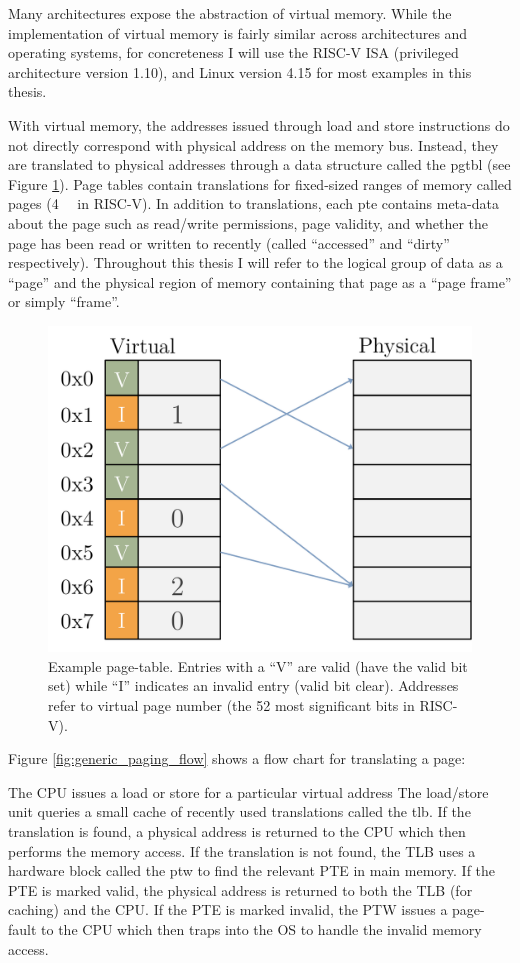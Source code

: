 Many architectures expose the abstraction of virtual memory. While the
implementation of virtual memory is fairly similar across architectures and
operating systems, for concreteness I will use the RISC-V ISA (privileged
architecture version 1.10\cite{riscv_priv110}), and Linux version
4.15\cite{linux} for most examples in this thesis.

With virtual memory, the addresses issued through load and store instructions
do not directly correspond with physical address on the memory bus. Instead,
they are translated to physical addresses through a data structure called the
\gls{pgtbl} (see Figure \ref{fig:generic_paging}).  Page tables contain
translations for fixed-sized ranges of memory called \glspl{page} (\SI{4}{\kibi\byte}
in RISC-V). In addition to translations, each \gls{pte} contains meta-data about the page such as read/write permissions, page
validity, and whether the page has been read or written to recently (called
``accessed'' and ``dirty'' respectively). Throughout this thesis I will refer to
the logical group of data as a ``page'' and the physical region of memory
containing that page as a ``page frame'' or simply ``frame''.  

\begin{figure}[h]
    \centering
    \includegraphics[width=0.5\columnwidth]{figs/generic_page_table.pdf}
    \vspace{-5mm}
    \caption{Example page-table. Entries with a ``V'' are valid (have the valid
             bit set) while ``I'' indicates an invalid entry (valid bit clear).
           Addresses refer to virtual page number (the 52 most significant bits
         in RISC-V).}
    \label{fig:generic_paging}
\end{figure}

Figure \ref{fig:generic_paging_flow} shows a flow chart for translating a page:

\begin{outline}[enumerate]
  \1 The CPU issues a load or store for a particular virtual address
  \1 The load/store unit queries a small cache of recently used translations
  called the \gls{tlb}.
    \2 If the translation is found, a physical address is returned to the CPU
    which then performs the memory access.
  \1 If the translation is not found, the TLB uses a hardware block called the
  \gls{ptw} to find the relevant PTE in main memory.
    \2 If the PTE is marked valid, the physical address is returned to both the
    TLB (for caching) and the CPU.
  \1 If the PTE is marked invalid, the PTW issues a page-fault to the CPU which
  then traps into the OS to handle the invalid memory access.
\end{outline}

